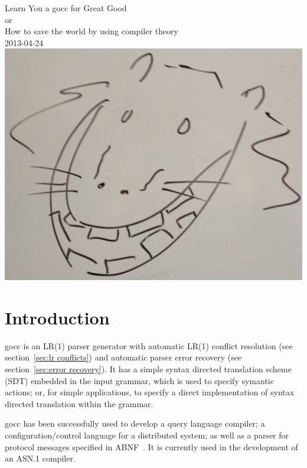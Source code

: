 \documentclass[12pt]{article}
\begin{document}
\begin{center}
	{\Huge Learn You a gocc for Great Good} \\
	{\large or \\
	How to save the world by using compiler theory \\
	\vspace{1cm}
	2013-04-24}\\
	\vspace{1cm}
	\includegraphics[scale=.1]{gocc}
\end{center}
\tableofcontents

\newcommand{\TBD}{\textcolor{red}{TBD}}
\newcommand{\TBDx}[1]{\textcolor{red}{TBD:} #1}
\newcommand{\Go}{{\em Go}\ }
\newcommand{\Code}[1]{{\bf #1} } 
\newcommand{\gocc}{{\em gocc}\ }
\newcommand{\Clang}{{\em C} language}

\section{Introduction}
	gocc is an LR(1) parser generator with automatic LR(1) conflict resolution (see section~\ref{sec:lr conflicts}) and automatic parser error recovery (see section~\ref{sec:error recovery}). It has a simple syntax directed translation scheme (SDT) embedded in the input grammar, which is used to specify symantic actions; or, for simple applications, to specify a direct implementation of syntax directed translation within the grammar.

	gocc has been successfully used to develop a query language compiler; a configuration/control language for a distributed system; as well as a parser for protocol messages specified in ABNF~\cite{ABNF}. It is currently used in the development of an ASN.1 compiler.
\end{document}
